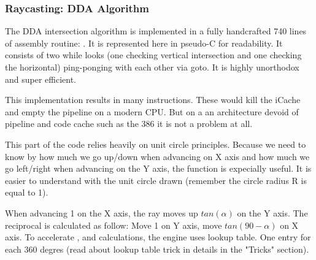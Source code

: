  
 
 
 
 
 
\subsubsection{Raycasting: DDA Algorithm}
The DDA intersection algorithm is implemented in a fully handcrafted 740 lines of assembly routine: . It is represented here in pseudo-C for readability. It consists of two while looks (one checking vertical intersection and one checking the horizontal) ping-ponging with each other via goto. It is highly unorthodox and super efficient.\\
\par



\begin{minipage}{\textwidth}

\end{minipage}
This implementation results in many  instructions. These would kill the iCache and empty the pipeline on a modern CPU. But on a an architecture devoid of pipeline and code cache such as the 386 it is not a problem at all.\\
\par
This part of the code relies heavily on unit circle principles. Because we need to know by how much we go up/down when advancing on X axis and how much we go left/right when advancing on the Y axis, the  function is expecially useful. It is easier to understand with the unit circle drawn (remember the circle radius R is equal to 1).
\begin{figure}[H]
\centering
 
\end{figure}
\par
When advancing 1 on the X axis, the ray moves up $tan(\alpha)$ on the Y axis. The reciprocal is calculated as follow: Move 1 on Y axis, move $tan(90-\alpha)$ on X axis. To accelerate ,  and  calculations, the engine uses lookup table. One entry for each 360 degres (read about lookup table trick in details in the "Tricks" section).




















